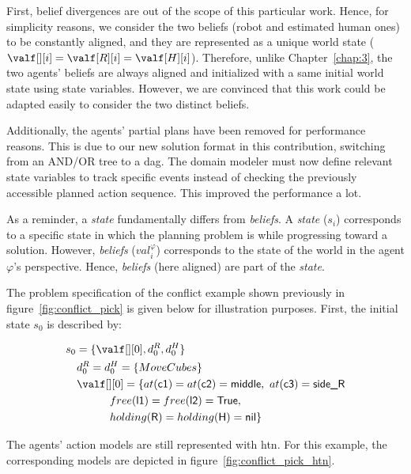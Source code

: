 First, belief divergences are out of the scope of this particular work. Hence, for simplicity reasons, we consider the two beliefs (robot and estimated human ones) to be constantly aligned, and they are represented as a unique world state ($\valf[][i] = \valf[R][i] = \valf[H][i]$). Therefore, unlike Chapter~\ref{chap:3}, the two agents' beliefs are always aligned and initialized with a same initial world state using state variables. However, we are convinced that this work could be adapted easily to consider the two distinct beliefs.

Additionally, the agents' partial plans have been removed for performance reasons. This is due to our new solution format in this contribution, switching from an AND/OR tree to a \acrfull{dag}. The domain modeler must now define relevant state variables to track specific events instead of checking the previously accessible planned action sequence. This improved the performance a lot.

As a reminder, a \textit{state} fundamentally differs from \textit{beliefs}. A \textit{state} ($s_i$) corresponds to a specific state in which the planning problem is while progressing toward a solution. However, \textit{beliefs} ($val^\varphi_i$) corresponds to the state of the world in the agent $\varphi$'s perspective. Hence, \textit{beliefs} (here aligned) are part of the \textit{state}.

The problem specification of the conflict example shown previously in figure~\ref{fig:conflict_pick} is given below for illustration purposes. First, the initial state $s_0$ is described by:

{\small
\begin{align*}
&s_0 = \{\valf[][0], d^R_0, d^H_0 \} \\
&\quad d^R_0 = d^H_0 = \{ MoveCubes \} \\
&\quad \valf[][0] = \{at(\textsf{c1}) = at(\textsf{c2}) = \textsf{middle},~at(\textsf{c3}) = \textsf{side\_R} \\
&\quad \quad \quad \quad free(\textsf{l1}) = free(\textsf{l2}) = \textsf{True}, \\
&\quad \quad \quad \quad holding(\textsf{R}) = holding(\textsf{H}) = \textsf{nil} \} \\
\end{align*}
}


The agents' action models are still represented with \acrshort{htn}. For this example, the corresponding models are depicted in figure~\ref{fig:conflict_pick_htn}. 


